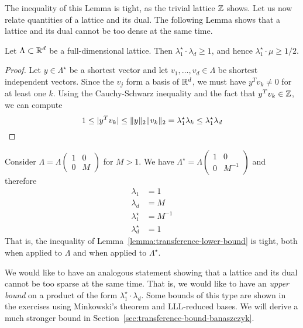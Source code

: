 The inequality of this Lemma is tight, as the trivial lattice $\mathbb{Z}$ shows.
Let us now relate quantities of a lattice and its dual.
The following Lemma shows that a lattice and its dual cannot be too dense at the same time.

\begin{lemma}
  \label{lemma:transference-lower-bound}
  Let $\Lambda \subset \mathbb{R}^d$ be a full-dimensional lattice.
  Then $\lambda_1^\star \cdot \lambda_d \geq 1$,
  and hence $\lambda_1^\star \cdot \mu \geq 1/2$.
\end{lemma}
\begin{proof}
  Let $y \in \Lambda^\star$ be a shortest vector
  and let $v_1, \ldots, v_d \in \Lambda$ be shortest independent vectors.
  Since the $v_j$ form a basis of $\mathbb{R}^d$,
  we must have $y^T v_k \neq 0$ for at least one $k$.
  Using the Cauchy-Schwarz inequality and the fact that $y^T v_k \in \mathbb{Z}$,
  we can compute
  \[
    1 \leq |y^T v_k| \leq \|y\|_2 \|v_k\|_2 = \lambda_1^\star \lambda_k \leq \lambda_1^\star \lambda_d \qedhere
  \]
\end{proof}

\begin{example}
  Consider $\Lambda = \Lambda \begin{pmatrix} 1 & 0 \\ 0 & M \end{pmatrix}$ for $M > 1$.
  We have $\Lambda^\star = \Lambda \begin{pmatrix} 1 & 0 \\ 0 & M^{-1} \end{pmatrix}$
  and therefore
  \begin{align*}
    \lambda_1 &= 1 \\
    \lambda_d &= M \\
    \lambda_1^\star &= M^{-1} \\
    \lambda_d^\star &= 1
  \end{align*}
  That is, the inequality of Lemma~\ref{lemma:transference-lower-bound} is tight,
  both when applied to $\Lambda$ and when applied to $\Lambda^\star$.
\end{example}

We would like to have an analogous statement showing
that a lattice and its dual cannot be too sparse at the same time.
That is, we would like to have an \emph{upper bound} on a product of the form $\lambda_1^\star \cdot \lambda_d$.
Some bounds of this type are shown in the exercises
using Minkowski's theorem and LLL-reduced bases.
We will derive a much stronger bound in Section~\ref{sec:transference-bound-banaszczyk}.



